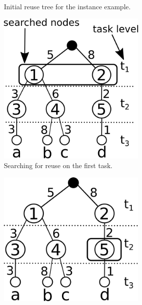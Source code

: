 \begin{figure}[h]
\begin{subfigure}[b]{0.3\textwidth}
			 \caption{Initial reuse tree for the instance example.}
			 \label{fig:gen2}
	 \end{subfigure}
	 \hspace{3mm}
	 \begin{subfigure}[b]{0.3\textwidth}
			 \centering
			 \includegraphics[width=0.8\textwidth]{img/gen3.png}
			 \caption{Searching for reuse on the first task.}
			 \label{fig:gen3}
	 \end{subfigure}
	 \par\bigskip
	 \begin{subfigure}[b]{0.3\textwidth}
			 \includegraphics[width=0.8\textwidth]{img/gen4.png}

\end{subfigure}
\end{figure}
